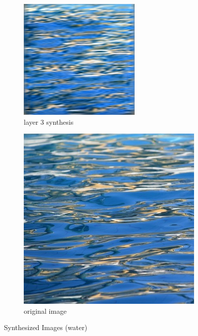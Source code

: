 \documentclass[11pt, oneside]{article}   	%
\begin{document}
\begin{figure}[H]
    \begin{subfigure}[b]{0.45\textwidth}
        \includegraphics[width=\textwidth]{figure/water/layer_03_001}
        \caption{layer 3 synthesis}
    \end{subfigure}
        \begin{subfigure}[b]{0.45\textwidth}
        \includegraphics[width=\textwidth]{figure/water/layer_00_001}
        \caption{original image}
    \end{subfigure}
    \caption{Synthesized Images (water)}\label{fig:waters}
\end{figure}
\end{document}
